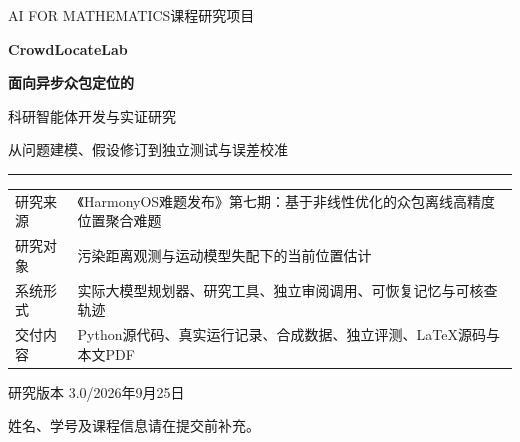 \documentclass[UTF8,a4paper,zihao=-4,fontset=none]{ctexart}
\theoremstyle{remark}
\begin{document}
\begin{titlepage}
\thispagestyle{empty}
\setlength{\parindent}{0pt}
\vspace*{14mm}
{\sffamily\large\color{teal}AI FOR MATHEMATICS\hfill 课程研究项目\par}
\vspace{18mm}
{\Huge\bfseries\color{navy}CrowdLocateLab\par}
\vspace{6mm}
{\LARGE\bfseries 面向异步众包定位的\par 科研智能体开发与实证研究\par}
\vspace{8mm}
{\large\color{muted}从问题建模、假设修订到独立测试与误差校准\par}
\vspace{12mm}
\noindent\color{teal}\rule{\textwidth}{1.1pt}\color{black}
\vspace{6mm}
\begin{tabularx}{\textwidth}{@{}p{27mm}Y@{}}
研究来源 & 《HarmonyOS难题发布》第七期：基于非线性优化的众包离线高精度位置聚合难题\\[4mm]
研究对象 & 污染距离观测与运动模型失配下的当前位置估计\\[4mm]
系统形式 & 实际大模型规划器、研究工具、独立审阅调用、可恢复记忆与可核查轨迹\\[4mm]
交付内容 & Python源代码、真实运行记录、合成数据、独立评测、LaTeX源码与本文PDF
\end{tabularx}
\vfill
{\color{muted}研究版本 3.0\quad /\quad 2026年9月25日\par}
\vspace{3mm}
{\small 姓名、学号及课程信息请在提交前补充。\par}
\end{titlepage}

\clearpage
\tableofcontents
\clearpage
{}







\clearpage




\clearpage

\clearpage

\clearpage


\clearpage
\appendix


\end{document}
